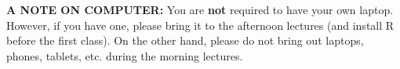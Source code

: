 \documentclass[12pt,a4paper]{article}
\begin{document}
\textbf{A NOTE ON COMPUTER:} You are \textbf{not} required to have your own laptop. However, if you have one, please bring it to the afternoon lectures (and install R before the first class). On the other hand, please do not bring out laptops, phones, tablets, etc. during the morning lectures.\\




 
\end{document}
